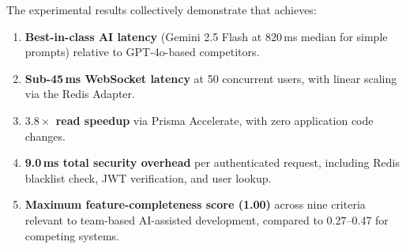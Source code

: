 The experimental results collectively demonstrate that \echoray{} achieves:

\begin{enumerate}[leftmargin=*, label=\textbf{R\arabic*.}]
  \item \textbf{Best-in-class AI latency} (Gemini 2.5 Flash at 820\,ms
    median for simple prompts) relative to GPT-4o-based competitors.
  \item \textbf{Sub-45\,ms WebSocket latency} at 50 concurrent users, with
    linear scaling via the Redis Adapter.
  \item \textbf{$3.8\times$ read speedup} via Prisma Accelerate, with zero
    application code changes.
  \item \textbf{9.0\,ms total security overhead} per authenticated request,
    including Redis blacklist check, JWT verification, and user lookup.
  \item \textbf{Maximum feature-completeness score (1.00)} across nine criteria
    relevant to team-based AI-assisted development, compared to 0.27--0.47 for
    competing systems.
\end{enumerate}
